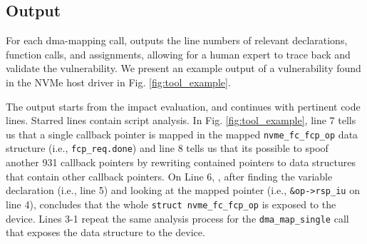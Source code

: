 \subsection{Output}
For each dma-mapping call, \tool outputs the line numbers of relevant declarations, function calls, and assignments, allowing for a human expert to trace back and validate the vulnerability. We present an example output of a vulnerability found in the NVMe host driver in Fig. \ref{fig:tool_example}.

The output starts from the impact evaluation, and continues with pertinent code lines. Starred lines contain script analysis. In Fig. \ref{fig:tool_example}, line 7 tells us that a single callback pointer is mapped in the mapped \texttt{nvme\_fc\_fcp\_op} data structure (i.e., \texttt{fcp\_req.done}) and line 8 tells us that its possible to spoof another 931 callback pointers by rewriting contained pointers to data structures that contain other callback pointers. On Line 6, \tool, after finding the variable declaration (i.e., line 5) and looking at the mapped pointer (i.e., \texttt{\&op->rsp\_iu} on line 4), concludes that the whole \texttt{struct nvme\_fc\_fcp\_op} is exposed to the device. Lines 3-1 repeat the same analysis process for the \texttt{dma\_map\_single} call that exposes the data structure to the device. 

